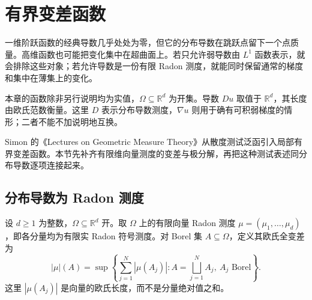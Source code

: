 \section{有界变差函数}
\label{b1:sec:2701}

一维阶跃函数的经典导数几乎处处为零，但它的分布导数在跳跃点留下一个点质量。高维函数也可能把变化集中在超曲面上。若只允许弱导数由 \(L^1\) 函数表示，就会排除这些对象；若允许导数是一份有限 Radon 测度，就能同时保留通常的梯度和集中在薄集上的变化。

\ProseParagraphBreak

本章的函数除非另行说明均为实值，\(\Omega\subseteq\mathbb R^d\) 为开集。导数 \(Du\) 取值于 \(\mathbb R^d\)，其长度由欧氏范数衡量。这里 \(D\) 表示分布导数测度，\(\nabla u\) 则用于确有可积弱梯度的情形；二者不能不加说明地互换。

\ProseParagraphBreak

Simon 的《Lectures on Geometric Measure Theory》\cite[\S6, 6.1]{Simon1983Lectures}从散度测试泛函引入局部有界变差函数。本节先补齐有限维向量测度的变差与极分解，再把这种测试表述同分布导数逐项连接起来。

\subsection{分布导数为 Radon 测度}
\label{b1:subsec:270101}

设 \(d\ge1\) 为整数，\(\Omega\subseteq\mathbb R^d\) 开。取 \(\Omega\) 上的有限向量 Radon 测度 \(\mu=(\mu_1,\ldots,\mu_d)\)，即各分量均为有限实 Radon 符号测度。对 Borel 集 \(A\subseteq\Omega\)，定义其欧氏全变差为
\[
 |\mu|(A)=
 \sup\left\{\sum_{j=1}^N|\mu(A_j)|:
       A=\bigsqcup_{j=1}^N A_j,\ A_j\text{ Borel}\right\}.
\]
这里 \(|\mu(A_j)|\) 是向量的欧氏长度，而不是分量绝对值之和。

